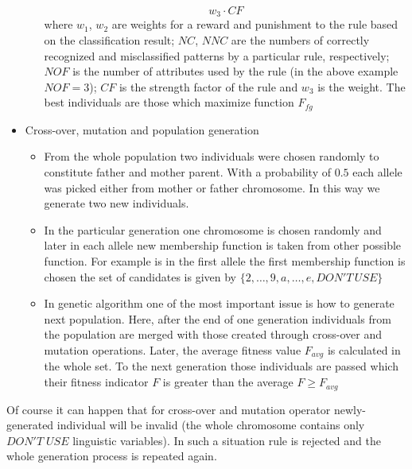\begin{itemize}
\begin{itemize}
\begin{equation}
                    w_3\cdot CF
                    \label{eq:fuzzy_fitness}
                \end{equation}
                where $w_1$, $w_2$ are weights for a reward and punishment to
                the rule based on the classification result; $NC$, $NNC$ are
                the numbers of correctly recognized and misclassified patterns
                by a particular rule, respectively; $NOF$ is the number of
                attributes used by the rule (in the above example $NOF=3$);
                $CF$ is the strength factor of the rule and $w_3$ is the weight.
                The best individuals are those which maximize function $F_{fg}$
        \end{itemize}
    \item Cross-over, mutation and population generation
        \begin{itemize}
            \item From the whole population two individuals were chosen
                randomly to constitute father and mother parent. With a
                probability of $0.5$ each allele was picked either from mother
                or father chromosome. In this way we generate two new
                individuals.
            \item In the particular generation one chromosome is chosen
                randomly and later in each allele new membership function is
                taken from other possible function. For example is in the first
                allele the first membership function is chosen the set of
                candidates is given by $\{2, \ldots, 9, a, \ldots, e, DON'T\, USE\}$
            \item In genetic algorithm one of the most important issue is how
                to generate next population. Here, after the end of one
                generation individuals from the population are merged with
                those created through cross-over and mutation operations.
                Later, the average fitness value $F_{avg}$ is calculated in the whole
                set. To the next generation those individuals are passed which
                their fitness indicator $F$ is greater than the average $F \ge F_{avg}$
        \end{itemize}
\end{itemize}
Of course it can happen that for cross-over and mutation operator
newly-generated individual will be invalid (the whole chromosome contains only
$DON'T\; USE$ linguistic variables). In such a situation rule is rejected and
the whole generation process is repeated again.

